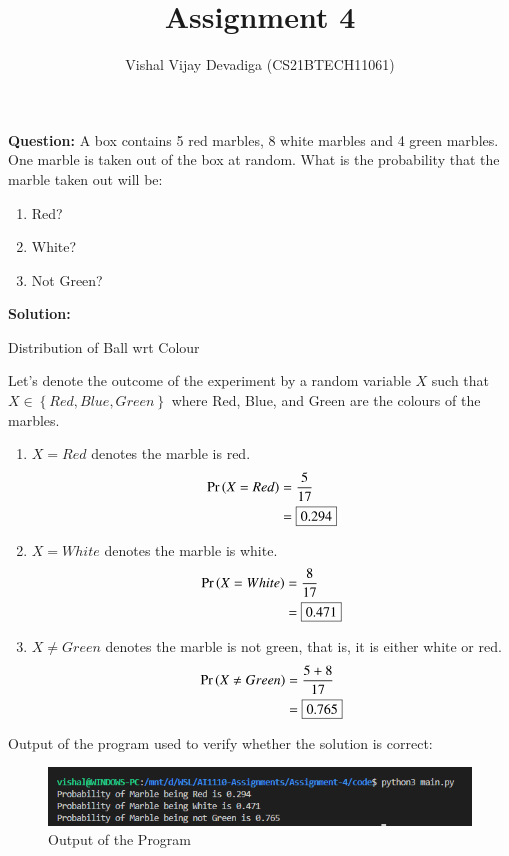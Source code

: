 \documentclass[journal,12pt,twocolumn]{IEEEtran}
\title{Assignment 4}
\author{Vishal Vijay Devadiga (CS21BTECH11061)}
\date{}
\providecommand{\pr}[1]{\ensuremath{\Pr\left(#1\right)}}
\providecommand{\cbrak}[1]{\ensuremath{\left\{#1\right\}}}
\newcommand{\question}{\noindent \textbf{Question: }}
\newcommand{\solution}{\noindent \textbf{Solution: }}
\begin{document}
\maketitle
\question
A box contains 5 red marbles, 8 white marbles and 4 green marbles. One marble is taken
out of the box at random. What is the probability that the marble taken out will be:
\begin{enumerate}[label=(\roman{enumi})]
	\item Red?
	\item White?
	\item Not Green?
\end{enumerate}
\solution
\begin{table}[H]
	
	\caption{Distribution of Ball wrt Colour}
	\label{tab1}
\end{table}
Let's denote the outcome of the experiment by a random variable $X$ such that
$X \in \cbrak{Red , Blue, Green}$ where Red, Blue, and Green are the colours of the marbles.
\begin{enumerate}[label=(\roman{enumi})]
    \item $X = Red$ denotes the marble is red.
    \begin{align}
        \pr{X = Red} & = \frac{5}{17} 
	    \\
	    & = \fbox{0.294}
    \end{align}
    \item $X = White$ denotes the marble is white.
    \begin{align}
        \pr{X = White} & = \frac{8}{17} 
	    \\
	    & = \fbox{0.471}
    \end{align}
    \item $X \not = Green$ denotes the marble is not green, that is, it is either white or red.
    \begin{align}
        \pr{X \not = Green} & = \frac{5+8}{17}
	    \\
	    & = \fbox{0.765}
    \end{align}
\end{enumerate}
Output of the program used to verify whether the solution is correct:
\begin{figure}[H]
	\centering
	\includegraphics[width = \columnwidth]{./figure/Output.png}
	\caption{Output of the Program}
	\label{fig1}
\end{figure}
\end{document}
